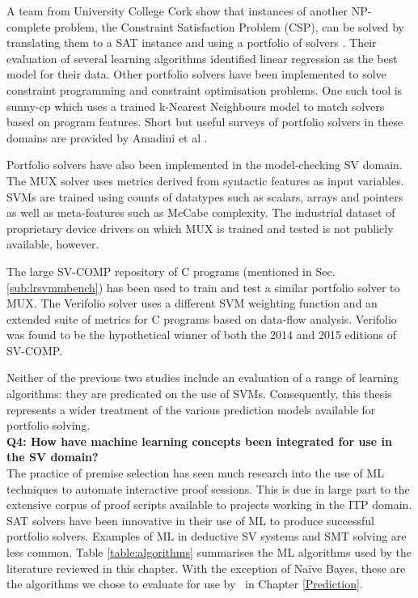 A team from University College Cork show that instances of another NP-complete problem, the Constraint Satisfaction Problem (CSP), can be solved by translating them to a SAT instance and using a portfolio of solvers \cite{Hurley2014}. Their evaluation of several learning algorithms identified linear regression as the best model for their data.
Other portfolio solvers have been implemented to solve constraint programming and constraint optimisation problems. 
One such tool is sunny-cp \cite{sunny-cp} which uses a trained k-Nearest Neighbours model to match solvers based on program features.
Short but useful surveys of portfolio solvers in these domains are provided by Amadini et al \cite{Amadini2013, Amadini2016}.   

Portfolio solvers have also been implemented in the model-checking SV domain. The MUX \cite{MUX} solver uses metrics derived from syntactic features as input variables. SVMs are trained using counts of datatypes such as scalars, arrays and pointers as well as meta-features such as McCabe complexity. The industrial dataset of proprietary device drivers on which MUX is trained and tested is not publicly available, however.   

The large SV-COMP repository of C programs (mentioned in Sec. \ref{sub:lrsvmmbench}) has been used to train and test a similar portfolio solver to MUX. The Verifolio \cite{DPVZ15:CAV} solver uses a different SVM weighting function and an extended suite of metrics for C programs based on data-flow analysis. Verifolio was found to be the hypothetical winner of both the 2014 and 2015 editions of SV-COMP. 

Neither of the previous two studies include an evaluation of a range of learning algorithms: they are predicated on the use of SVMs. Consequently, this thesis represents a wider treatment of the various prediction models available for portfolio solving. \\

\textbf{Q4: How have machine learning concepts been integrated for use in the SV domain?} \\
The practice of premise selection has seen much research into the use of ML techniques to automate interactive proof sessions.
This is due in large part to the extensive corpus of proof scripts available to projects working in the ITP domain.
SAT solvers have been innovative in their use of ML to produce successful portfolio solvers.
Examples of ML in deductive SV systems and SMT solving are less common. 
Table \ref{table:algorithms} summarises the ML algorithms used by the literature reviewed in this chapter. With the exception of Na{\"i}ve Bayes, these are the algorithms we chose to evaluate for use by \where~in Chapter \ref{Prediction}.

